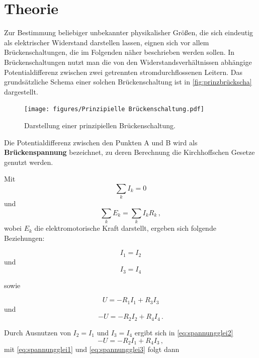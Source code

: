 \section{Theorie}
\label{sec:Theorie}

Zur Bestimmung beliebiger unbekannter physikalisher Größen, die sich eindeutig als elektrischer Widerstand darstellen lassen, eignen sich vor allem Brückenschaltungen, die im Folgenden näher beschrieben werden sollen. 
In Brückenschaltungen nutzt man die von den Widerstandsverhältnissen abhängige Potentialdifferenz zwischen zwei getrennten stromdurchflossenen Leitern. Das grundsätzliche Schema einer solchen Brückenschaltung ist in \autoref{fig:prinzbrückscha} dargestellt.

\begin{figure}[H]
    \centering
    \texttt{[image: figures/Prinzipielle Brückenschaltung.pdf]}
    \caption{Darstellung einer prinzipiellen Brückenschaltung\cite{ap07}.}
    \label{fig:prinzbrückscha}
\end{figure}

Die Potentialdifferenz zwischen den Punkten A und B wird als \textbf{Brückenspannung} bezeichnet, zu deren Berechnung die Kirchhoffschen Gesetze genutzt werden.

Mit 
\begin{equation}
    \sum_kI_k = 0
    \label{eq:kirchhoff1}
\end{equation}
und 
\begin{equation}
    \sum_k E_k = \sum_k I_k R_k \,,
    \label{eq:kirchhoff2}
\end{equation} wobei $E_k$ die elektromotorische Kraft darstellt,
ergeben sich folgende Beziehungen:

\begin{equation*}
    I_1 = I_2
\end{equation*}
und
\begin{equation*}
    I_3 = I_4
\end{equation*}

sowie

\begin{equation}
    U = -R_1 I_1 + R_3 I_3
    \label{eq:spannungglei1}
\end{equation}
und
\begin{equation}
    -U = -R_2 I_2 + R_4 I_4 \,.
    \label{eq:spannungglei2}
\end{equation}

Durch Ausnutzen von $I_2 = I_1$ und $I_3 = I_4$ ergibt sich in \eqref{eq:spannungglei2}
\begin{equation}
    -U = -R_2 I_1 + R_4 I_3
    \label{eq:spannungglei3} \,, 
\end{equation}
mit \eqref{eq:spannungglei1} und \eqref{eq:spannungglei3} folgt dann

